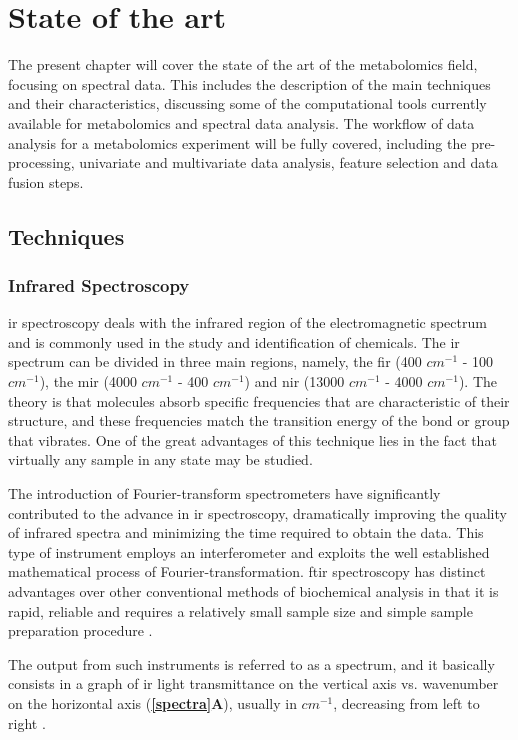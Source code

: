 
\chapter{State of the art}

The present chapter will cover the state of the art of the metabolomics field, focusing on spectral data. This includes the description of the main techniques and their characteristics, discussing some of the computational tools currently available for metabolomics and spectral data analysis. The workflow of data analysis for a metabolomics experiment will be fully covered, including the pre-processing, univariate and multivariate data analysis, feature selection and data fusion steps.


\section{Techniques}

\subsection{Infrared Spectroscopy}

\acrfull{ir} spectroscopy deals with the infrared region of the electromagnetic spectrum and is commonly used in the study and identification of chemicals. The \gls{ir} spectrum can be divided in three main regions, namely, the \gls{fir} (400 $ cm^{-1} $ - 100 $ cm^{-1} $), the \gls{mir} (4000 $ cm^{-1} $ - 400 $ cm^{-1} $) and \gls{nir} (13000 $ cm^{-1} $ - 4000 $ cm^{-1} $). The theory is that molecules absorb specific frequencies that are characteristic of their structure, and these frequencies match the transition energy of the bond or group that vibrates. One of the great advantages of this technique lies in the fact that virtually any sample in any state may be studied.

The introduction of Fourier-transform spectrometers have significantly contributed to the advance in \gls{ir} spectroscopy, dramatically improving the quality of infrared spectra and minimizing the time required to obtain the data. This type of instrument employs an interferometer and exploits the well established mathematical process of Fourier-transformation. \gls{ftir} spectroscopy has distinct advantages over other conventional methods of biochemical analysis in that it is rapid, reliable and requires a relatively small sample size and simple sample preparation procedure \citep{kansiz1999fourier}. 

The output from such instruments is referred to as a spectrum, and it basically consists in a graph of \gls{ir} light transmittance on the vertical axis vs. wavenumber on the horizontal axis (\textbf{\autoref{spectra}A}), usually in $ cm^{-1} $, decreasing from left to right \citep{Stuart2004}.

